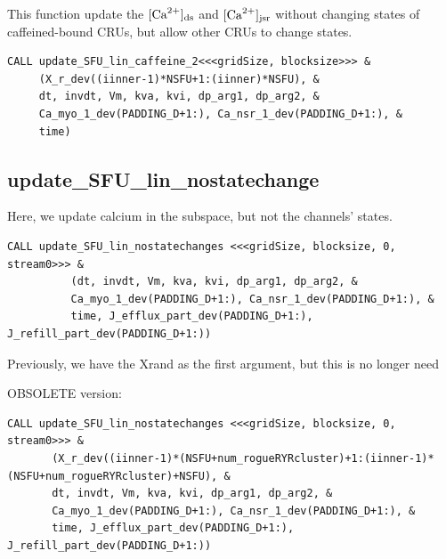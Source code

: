 This function update the $[{\text{Ca}^{2+}}]_{\text{ds}}$ and $[{\text{Ca}^{2+}}]_{\text{jsr}}$ without changing states of
caffeined-bound CRUs, but allow other CRUs to change states.
\begin{verbatim}
CALL update_SFU_lin_caffeine_2<<<gridSize, blocksize>>> &
     (X_r_dev((iinner-1)*NSFU+1:(iinner)*NSFU), &
     dt, invdt, Vm, kva, kvi, dp_arg1, dp_arg2, &
     Ca_myo_1_dev(PADDING_D+1:), Ca_nsr_1_dev(PADDING_D+1:), &
     time)
\end{verbatim}


\subsection{update\_SFU\_lin\_nostatechange}
\label{sec:update_SFU_lin_nostatechange}

Here, we update calcium in the subspace, but not the channels' states.
\begin{verbatim}
CALL update_SFU_lin_nostatechanges <<<gridSize, blocksize, 0, stream0>>> &                                                                                                                                        
          (dt, invdt, Vm, kva, kvi, dp_arg1, dp_arg2, &                                                                                                                                                                
          Ca_myo_1_dev(PADDING_D+1:), Ca_nsr_1_dev(PADDING_D+1:), &                                                                                                                                                    
          time, J_efflux_part_dev(PADDING_D+1:), J_refill_part_dev(PADDING_D+1:))   
\end{verbatim}
Previously, we have the Xrand as the first argument, but this is no longer need

OBSOLETE version:
{\small
\begin{verbatim}
CALL update_SFU_lin_nostatechanges <<<gridSize, blocksize, 0, stream0>>> &                                                                                                                                        
       (X_r_dev((iinner-1)*(NSFU+num_rogueRYRcluster)+1:(iinner-1)*(NSFU+num_rogueRYRcluster)+NSFU), &                                                                                                              
       dt, invdt, Vm, kva, kvi, dp_arg1, dp_arg2, &                                                                                                                                                                 
       Ca_myo_1_dev(PADDING_D+1:), Ca_nsr_1_dev(PADDING_D+1:), &                                                                                                                                                    
       time, J_efflux_part_dev(PADDING_D+1:), J_refill_part_dev(PADDING_D+1:))   
\end{verbatim}
} 


